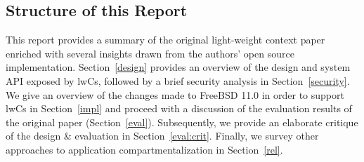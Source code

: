 \documentclass[10pt,twocolumn,a4paper]{article}
\begin{document}
\subsection{Structure of this Report}
This report provides a summary of the original light-weight context paper enriched with several insights drawn from the authors' open source implementation.
Section~\ref{design} provides an overview of the design and system API exposed by lwCs,
followed by a brief security analysis in Section~\ref{security}.
We give an overview of the changes made to FreeBSD 11.0 in order to support lwCs in Section~\ref{impl} and proceed with a discussion of the evaluation results of the original paper (Section~\ref{eval}).
Subsequently, we provide an elaborate critique of the design \& evaluation in Section~\ref{eval:crit}.
Finally, we survey other approaches to application compartmentalization in Section~\ref{rel}.
\end{document}
